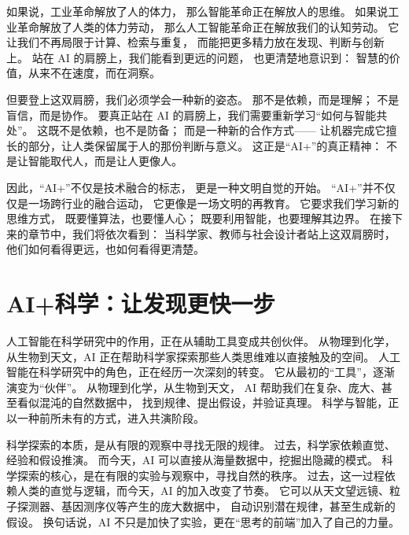 如果说，工业革命解放了人的体力，  
那么智能革命正在解放人的思维。  
如果说工业革命解放了人类的体力劳动，  
那么人工智能革命正在解放我们的认知劳动。  
它让我们不再局限于计算、检索与重复，  
而能把更多精力放在发现、判断与创新上。  
站在 AI 的肩膀上，我们能看到更远的问题，  
也更清楚地意识到：  
智慧的价值，从来不在速度，而在洞察。

但要登上这双肩膀，我们必须学会一种新的姿态。  
那不是依赖，而是理解；  
不是盲信，而是协作。  
要真正站在 AI 的肩膀上，我们需要重新学习“如何与智能共处”。  
这既不是依赖，也不是防备；  
而是一种新的合作方式——  
让机器完成它擅长的部分，让人类保留属于人的那份判断与意义。  
这正是“AI+”的真正精神：  
不是让智能取代人，而是让人更像人。

因此，“AI+”不仅是技术融合的标志，  
更是一种文明自觉的开始。  
“AI+”并不仅仅是一场跨行业的融合运动，  
它更像是一场文明的再教育。  
它要求我们学习新的思维方式，  
既要懂算法，也要懂人心；  
既要利用智能，也要理解其边界。  
在接下来的章节中，我们将依次看到：  
当科学家、教师与社会设计者站上这双肩膀时，  
他们如何看得更远，也如何看得更清楚。


\section{AI+科学：让发现更快一步}

人工智能在科学研究中的作用，正在从辅助工具变成共创伙伴。  
从物理到化学，从生物到天文，AI 正在帮助科学家探索那些人类思维难以直接触及的空间。  
人工智能在科学研究中的角色，正在经历一次深刻的转变。  
它从最初的“工具”，逐渐演变为“伙伴”。  
从物理到化学，从生物到天文，  
AI 帮助我们在复杂、庞大、甚至看似混沌的自然数据中，  
找到规律、提出假设，并验证真理。  
科学与智能，正以一种前所未有的方式，进入共演阶段。

科学探索的本质，是从有限的观察中寻找无限的规律。  
过去，科学家依赖直觉、经验和假设推演。  
而今天，AI 可以直接从海量数据中，挖掘出隐藏的模式。  
科学探索的核心，是在有限的实验与观察中，寻找自然的秩序。  
过去，这一过程依赖人类的直觉与逻辑，而今天，AI 的加入改变了节奏。  
它可以从天文望远镜、粒子探测器、基因测序仪等产生的庞大数据中，  
自动识别潜在规律，甚至生成新的假设。  
换句话说，AI 不只是加快了实验，更在“思考的前端”加入了自己的力量。

